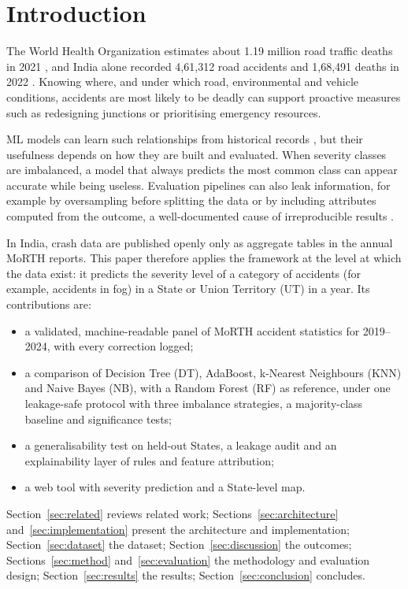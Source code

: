 \documentclass[conference]{IEEEtran}
\begin{document}
\section{Introduction}

The World Health Organization estimates about 1.19 million road traffic deaths in 2021 \cite{who2023}, and India alone recorded 4,61,312 road accidents and 1,68,491 deaths in 2022 \cite{morth2022}. Knowing where, and under which road, environmental and vehicle conditions, accidents are most likely to be deadly can support proactive measures such as redesigning junctions or prioritising emergency resources.

ML models can learn such relationships from historical records \cite{behboudi2024}, but their usefulness depends on how they are built and evaluated. When severity classes are imbalanced, a model that always predicts the most common class can appear accurate while being useless. Evaluation pipelines can also leak information, for example by oversampling before splitting the data or by including attributes computed from the outcome, a well-documented cause of irreproducible results \cite{kapoor2023}.

In India, crash data are published openly only as aggregate tables in the annual MoRTH reports. This paper therefore applies the framework at the level at which the data exist: it predicts the severity level of a category of accidents (for example, accidents in fog) in a State or Union Territory (UT) in a year. Its contributions are:
\begin{itemize}
\item a validated, machine-readable panel of MoRTH accident statistics for 2019--2024, with every correction logged;
\item a comparison of Decision Tree (DT), AdaBoost, k-Nearest Neighbours (KNN) and Naive Bayes (NB), with a Random Forest (RF) as reference, under one leakage-safe protocol with three imbalance strategies, a majority-class baseline and significance tests;
\item a generalisability test on held-out States, a leakage audit and an explainability layer of rules and feature attribution;
\item a web tool with severity prediction and a State-level map.
\end{itemize}

Section~\ref{sec:related} reviews related work; Sections~\ref{sec:architecture} and~\ref{sec:implementation} present the architecture and implementation; Section~\ref{sec:dataset} the dataset; Section~\ref{sec:discussion} the outcomes; Sections~\ref{sec:method} and~\ref{sec:evaluation} the methodology and evaluation design; Section~\ref{sec:results} the results; Section~\ref{sec:conclusion} concludes.
\end{document}
